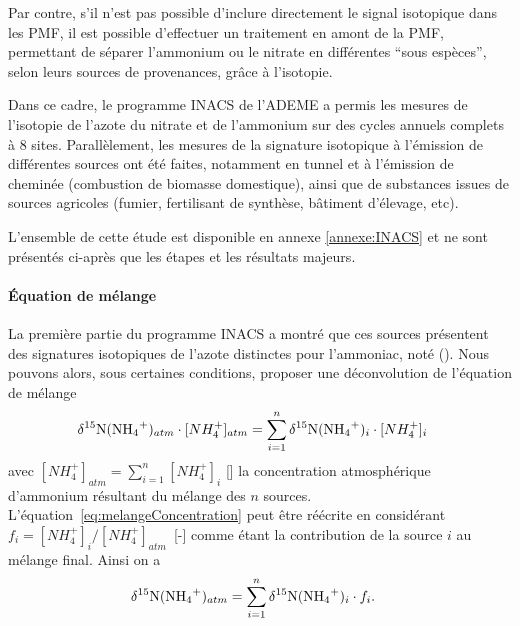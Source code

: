 Par contre, s'il n'est pas possible d'inclure directement le signal isotopique dans les
PMF, il est possible d'effectuer un traitement en amont de la PMF, permettant de séparer
l'ammonium ou le nitrate en différentes ``sous espèces'', selon leurs sources de
provenances, grâce à l'isotopie.

Dans ce cadre, le programme INACS de l'ADEME a permis les mesures de l'isotopie de l'azote
du nitrate et de l'ammonium sur des cycles annuels complets à 8 sites.  Parallèlement, les
mesures de la signature isotopique à l'émission de différentes sources ont été faites,
notamment en tunnel et à l'émission de cheminée (combustion de biomasse domestique), ainsi
que de substances issues de sources agricoles (fumier, fertilisant de synthèse, bâtiment
d'élevage, etc).

L'ensemble de cette étude est disponible en annexe \ref{annexe:INACS} et ne sont présentés
ci-après que les étapes et les résultats majeurs.

\paragraph{Équation de mélange}%
\label{par:équation_de_mélange}

La première partie du programme INACS a montré que ces sources présentent des signatures
isotopiques de l'azote distinctes pour l'ammoniac, noté \dN(\NHq).
Nous pouvons alors, sous certaines conditions, proposer une déconvolution de l'équation de mélange
\begin{align}
    \dN(\NHq)_{atm} \cdot [NH_4^+]_{atm} &= \sum_{i=1}^{n} \dN(\NHq)_i \cdot [NH_4^+]_i
    \label{eq:melangeConcentration}
\end{align}
avec $[NH_4^+]_{atm} = \sum_{i=1}^n [NH_4^+]_i$ [\si{\ugm}] la concentration atmosphérique
d'ammonium résultant du mélange des $n$ sources.  L'équation~\ref{eq:melangeConcentration}
peut être réécrite en considérant $f_i = [NH_4^+]_i / [NH_4^+]_{atm}$~[-] comme étant la
contribution de la source $i$ au mélange final. Ainsi on a
\begin{align}
    \dN(\NHq)_{atm} &= \sum_{i=1}^n \dN(\NHq)_i \cdot f_i. 
    \label{eq:melangeContrib}
\end{align}

